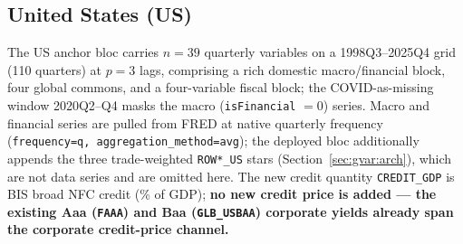 \subsection{United States (US)}\label{sec:data-us}

The US anchor bloc carries $n=39$ quarterly variables on a
1998Q3--2025Q4 grid (110 quarters) at $p=3$ lags, comprising a rich
domestic macro/financial block, four global commons, and a four-variable
fiscal block; the COVID-as-missing window 2020Q2--Q4 masks the macro
(\texttt{isFinancial} $=0$) series. Macro and financial series are pulled
from FRED at native quarterly frequency (\texttt{frequency=q,
aggregation\_method=avg}); the deployed bloc additionally appends the
three trade-weighted \texttt{ROW*\_US} stars (Section~\ref{sec:gvar:arch}),
which are not data series and are omitted here. The new credit quantity
\texttt{CREDIT\_GDP} is BIS broad NFC credit (\% of GDP);
\textbf{no new credit price is added --- the existing Aaa (\texttt{FAAA})
and Baa (\texttt{GLB\_USBAA}) corporate yields already span the corporate
credit-price channel.}

